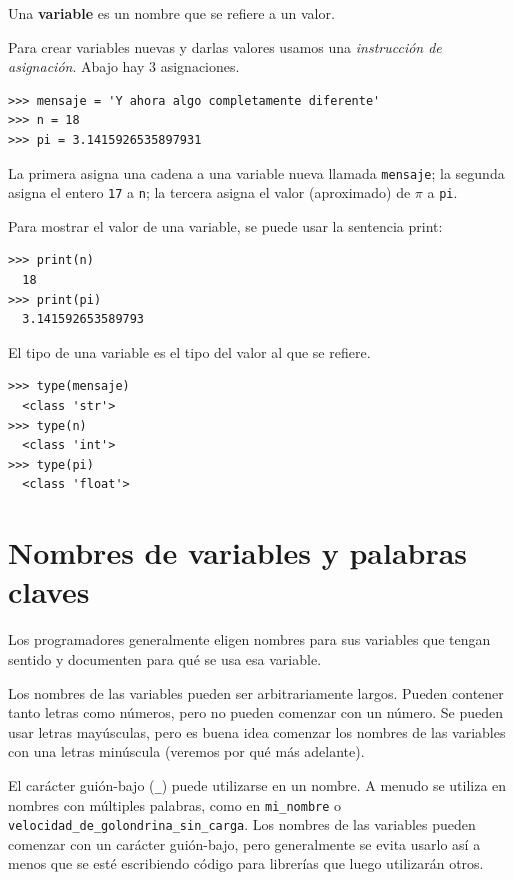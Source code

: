 \begin{definition}
Una \textbf{variable} es un nombre que se refiere a un valor.
\end{definition}

Para crear variables nuevas y darlas
valores usamos una \emph{instrucción de asignación}. Abajo hay 3 asignaciones.

\begin{Verbatim}[frame=single]
>>> mensaje = 'Y ahora algo completamente diferente'
>>> n = 18
>>> pi = 3.1415926535897931
\end{Verbatim}

La primera asigna una cadena a una
variable nueva llamada \texttt{mensaje}; la segunda asigna el entero
\texttt{17} a \texttt{n}; la tercera asigna el valor (aproximado) de
\(\pi\) a \texttt{pi}.

Para mostrar el valor de una variable, se puede usar la sentencia print:

\begin{Verbatim}[frame=single]
>>> print(n)
  18
>>> print(pi)
  3.141592653589793
\end{Verbatim}


El tipo de una variable es el tipo del valor al que se refiere.

\begin{Verbatim}[frame=single]
>>> type(mensaje)
  <class 'str'>
>>> type(n)
  <class 'int'>
>>> type(pi)
  <class 'float'>
\end{Verbatim}


\hypertarget{nombres-de-variables-y-palabras-claves}{%
\section{Nombres de variables y palabras
claves}\label{nombres-de-variables-y-palabras-claves}}


Los programadores generalmente eligen nombres para sus variables que
tengan sentido y documenten para qué se usa esa variable.

Los nombres de las variables pueden ser arbitrariamente largos. Pueden
contener tanto letras como números, pero no pueden comenzar con un
número. Se pueden usar letras mayúsculas, pero es buena idea comenzar
los nombres de las variables con una letras minúscula (veremos por qué
más adelante).

El carácter guión-bajo (\texttt{\_}) puede utilizarse en un nombre. A
menudo se utiliza en nombres con múltiples palabras, como en
\texttt{mi\_nombre} o \texttt{velocidad\_de\_golondrina\_sin\_carga}.
Los nombres de las variables pueden comenzar con un carácter guión-bajo,
pero generalmente se evita usarlo así a menos que se esté escribiendo
código para librerías que luego utilizarán otros.

